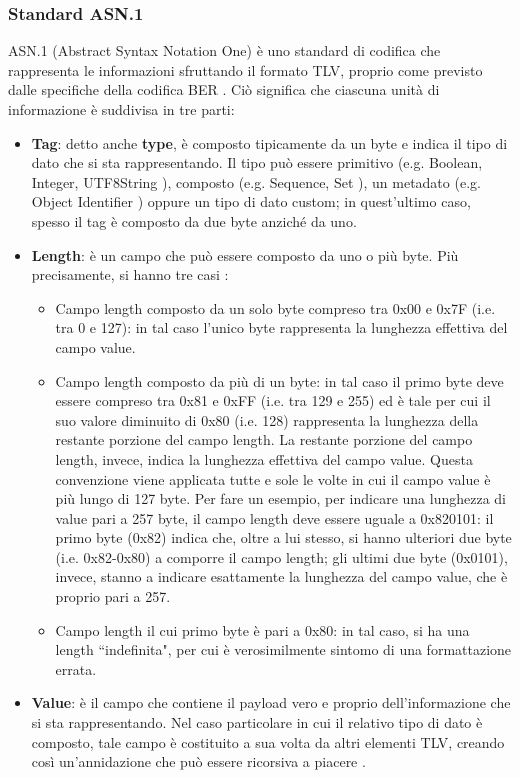 \documentclass[10pt, oneside]{book}
\begin{document}
\subsubsection{Standard ASN.1}
ASN.1 (Abstract Syntax Notation One) è uno standard di codifica che rappresenta le informazioni sfruttando il formato TLV, proprio come previsto dalle specifiche della codifica BER \cite{RFC-6025}\cite{ASN1}. Ciò significa che ciascuna unità di informazione è suddivisa in tre parti:
\begin{itemize}
\item \textbf{Tag}: detto anche \textbf{type}, è composto tipicamente da un byte e indica il tipo di dato che si sta rappresentando. Il tipo può essere primitivo (e.g. Boolean, Integer, UTF8String \cite{ASN1-types}), composto (e.g. Sequence, Set \cite{ASN1-types}), un metadato (e.g. Object Identifier \cite{ASN1-types}) oppure un tipo di dato custom; in quest'ultimo caso, spesso il tag è composto da due byte anziché da uno.
\item \textbf{Length}: è un campo che può essere composto da uno o più byte. Più precisamente, si hanno tre casi \cite{ASN1}:
\begin{itemize}[itemsep=0pt]
\item Campo length composto da un solo byte compreso tra 0x00 e 0x7F (i.e. tra 0 e 127): in tal caso l'unico byte rappresenta la lunghezza effettiva del campo value.
\item Campo length composto da più di un byte: in tal caso il primo byte deve essere compreso tra 0x81 e 0xFF (i.e. tra 129 e 255) ed è tale per cui il suo valore diminuito di 0x80 (i.e. 128) rappresenta la lunghezza della restante porzione del campo length. La restante porzione del campo length, invece, indica la lunghezza effettiva del campo value. Questa convenzione viene applicata tutte e sole le volte in cui il campo value è più lungo di 127 byte. Per fare un esempio, per indicare una lunghezza di value pari a 257 byte, il campo length deve essere uguale a 0x820101: il primo byte (0x82) indica che, oltre a lui stesso, si hanno ulteriori due byte (i.e. 0x82-0x80) a comporre il campo length; gli ultimi due byte (0x0101), invece, stanno a indicare esattamente la lunghezza del campo value, che è proprio pari a 257.
\item Campo length il cui primo byte è pari a 0x80: in tal caso, si ha una length ``indefinita", per cui è verosimilmente sintomo di una formattazione errata.
\end{itemize}
\item \textbf{Value}: è il campo che contiene il payload vero e proprio dell'informazione che si sta rappresentando. Nel caso particolare in cui il relativo tipo di dato è composto, tale campo è costituito a sua volta da altri elementi TLV, creando così un'annidazione che può essere ricorsiva a piacere \cite{ASN1}.
\end{itemize}
\end{document}

